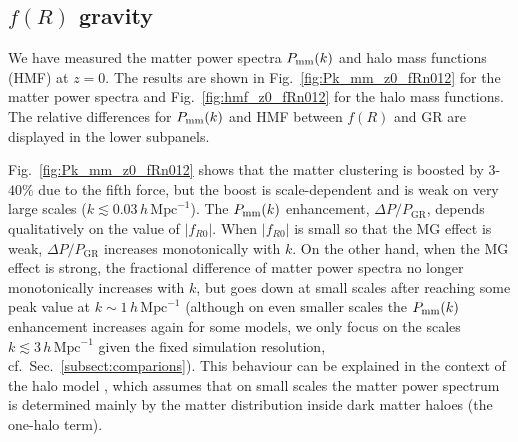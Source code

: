 \subsection{$f(R)$ gravity}
\label{subsect:fR_runs}

We have measured the matter power spectra $P_{\rm mm} (k)$ and halo mass functions (HMF) at $z = 0$. The results are shown in Fig.~\ref{fig:Pk_mm_z0_fRn012} for the matter power spectra and Fig.~\ref{fig:hmf_z0_fRn012} for the halo mass functions. The relative differences for $P_{\rm mm}(k)$ and HMF between $f(R)$ and \ac{GR} are displayed in the lower subpanels.

Fig.~\ref{fig:Pk_mm_z0_fRn012} shows that the matter clustering is boosted by $3$-$40\%$ due to the fifth force, but the boost is scale-dependent and is weak on very large scales ($k \lesssim 0.03 \, h \, \mathrm{Mpc}^{-1}$).
The $P_{\rm mm}(k)$ enhancement, $\Delta P / P_{\mathrm{GR}}$, depends qualitatively on the value of $|f_{R0}|$.
When $|f_{R0}|$ is small so that the \ac{MG} effect is weak, $\Delta P / P_{\mathrm{GR}}$ increases monotonically with $k$. On the other hand, when the \ac{MG} effect is strong, the fractional difference of matter power spectra no longer monotonically increases with $k$, but goes down at small scales after reaching some peak value at $k \sim 1 \, h \,\mathrm{Mpc}^{-1}$ (although on even smaller scales the $P_{\rm mm}(k)$ enhancement increases again for some models, we only focus on the scales $k \lesssim 3 \, h\,\mathrm{Mpc}^{-1}$ given the fixed simulation resolution, cf.~Sec.~\ref{subsect:comparions}).
This behaviour can be explained in the context of the halo model \citep{Cooray:2002PhR...372....1C}, which assumes that on small scales the matter power spectrum is determined mainly by the matter distribution inside dark matter haloes (the one-halo term).
